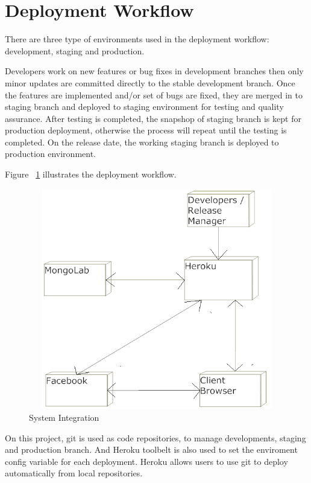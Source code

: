 \section{Deployment Workflow}
There are three type of environments used in the deployment workflow: development, staging and production.

Developers work on new features or bug fixes in development branches then only minor updates are committed directly to the stable development branch. Once the features are implemented and/or set of bugs are fixed, they are merged in to staging branch and deployed to staging environment for testing and quality assurance. After testing is completed, the snapshop of staging branch is kept for production deployment, otherwise the process will repeat until the testing is completed. On the release date, the working staging branch is deployed to production environment. 

Figure ~\ref{fig:system-integration} illustrates the deployment workflow.

\vspace{3em}
\begin{figure}[H]
\begin{center}
\includegraphics[height=3.8in,width=6.5in]{images/systemIntegration.png}
\caption{System Integration}
\label{fig:system-integration}
\end{center}
\end{figure}


On this project, git is used as code repositories, to manage developments, staging and production branch. And Heroku toolbelt is also used to set the enviroment config variable for each deployment. Heroku allows users to use git to deploy automatically from local repositories. 
 
